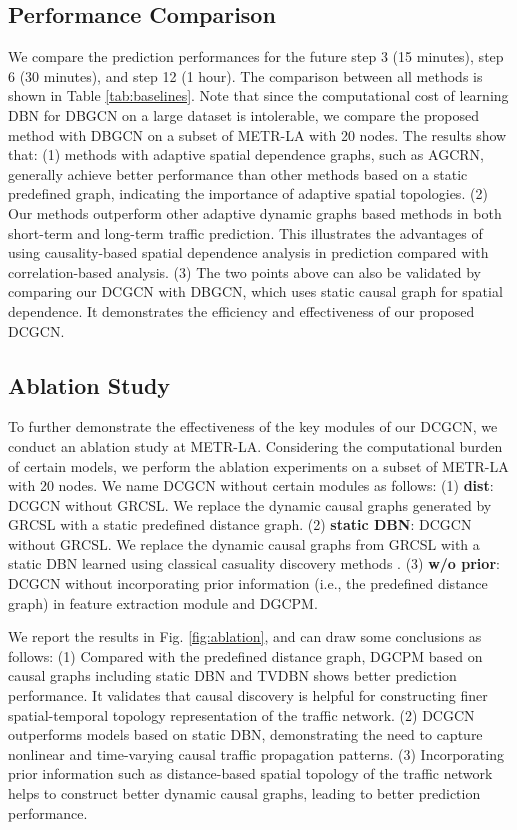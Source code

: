 \documentclass[letterpaper, 10 pt, conference]{ieeeconf}
\begin{document}
\subsection{Performance Comparison}

We compare the prediction performances for the future step 3 (15 minutes), step 6 (30 minutes), and step 12 (1 hour). The comparison between all methods is shown in Table \ref{tab:baselines}. Note that since the computational cost of learning DBN for DBGCN on a large dataset is intolerable, we compare the proposed method with DBGCN on a subset of METR-LA with 20 nodes. The results show that: (1) methods with adaptive spatial dependence graphs, such as AGCRN, generally achieve better performance than other methods based on a static predefined graph, indicating the importance of adaptive spatial topologies. (2) Our methods outperform other adaptive dynamic graphs based methods in both short-term and long-term traffic prediction. This illustrates the advantages of using causality-based spatial dependence analysis in prediction compared with correlation-based analysis. (3) The two points above can also be validated by comparing our DCGCN with DBGCN, which uses static causal graph for spatial dependence. It demonstrates the efficiency and effectiveness of our proposed DCGCN. 

\subsection{Ablation Study}





To further demonstrate the effectiveness of the key modules of our DCGCN, we conduct an ablation study at METR-LA. Considering the computational burden of certain models, we perform the ablation experiments on a subset of METR-LA with 20 nodes. We name DCGCN without certain modules as follows: (1) \textbf{dist}: DCGCN without GRCSL. We replace the dynamic causal graphs generated by GRCSL with a static predefined distance graph. (2) \textbf{static DBN}: DCGCN without GRCSL. We replace the dynamic causal graphs from GRCSL with a static DBN learned using classical casuality discovery methods \cite{trabelsi2013dynamic}.
(3) \textbf{w/o prior}: DCGCN without incorporating prior information (i.e., the predefined distance graph) in feature extraction module and DGCPM.

We report the results in Fig. \ref{fig:ablation}, and can draw some conclusions as follows: (1) Compared with the predefined distance graph, DGCPM based on causal graphs including static DBN and TVDBN shows better prediction performance. It validates that causal discovery is helpful for constructing finer spatial-temporal topology representation of the traffic network. (2) DCGCN outperforms models based on static DBN, demonstrating the need to capture nonlinear and time-varying causal traffic propagation patterns. (3) Incorporating prior information such as distance-based spatial topology of the traffic network helps to construct better dynamic causal graphs, leading to better prediction performance.
\end{document}
